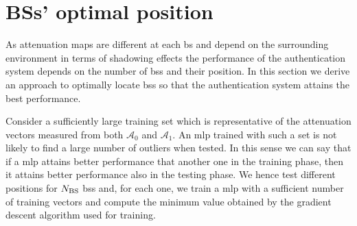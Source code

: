 \documentclass[draftcls,onecolumn,12pt]{IEEEtran}
\begin{document}

\section{BSs' optimal position}\label{sec:bsPos}
As attenuation maps are different at each \ac{bs} and depend on the surrounding environment in terms of shadowing effects the performance of the authentication system depends on the number of \acp{bs} and their position. In this section we derive an approach to optimally locate \acp{bs} so that the authentication system attains the best performance. 

Consider a sufficiently large training set which is representative of the attenuation vectors measured from both $\mathcal{A}_0$ and $\mathcal{A}_1$. An \ac{mlp} trained with such a set is not likely to find a large number of outliers when tested. In this sense we can say that if a \ac{mlp} attains better performance that another one in the training phase, then it attains better performance also in the testing phase. We hence test different positions for $N_{\rm BS}$ \acp{bs} and, for each one, we train a \ac{mlp} with a sufficient number of training vectors and compute the minimum value obtained by the gradient descent algorithm used for training.
\end{document}
